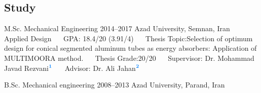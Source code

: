 \documentclass[
	a4paper,
]{ThirtyNinesecondscv}
\begin{document}
\makefrontsidebar



\subsection{Study}
\begin{cvtable}[1.5]
	\Educvitem
            {\faGraduationCap}
            {M.Sc. Mechanical Engineering}
            {2014--2017}
            {Azad University, Semnan, Iran}
    		{ }
            \Shortcustomcvitem
            {~~}
            {\hspace{-0.3em}Applied Design}
            {}
            \Shortcustomcvitem
            {~~}
            {GPA:}
            {18.4/20 (3.91/4)}
            \Shortcustomcvitem
            {~~}
            {Thesis Topic:}{{\small Selection of optimum design for conical segmented aluminum tubes as energy absorbers: Application of MULTIMOORA method.}}
            \Shortcustomcvitem
            {~~}
            {Thesis Grade:}{20/20}
            \Shortcustomcvitem
            {~~}
            {Supervisor:}
            {Dr. Mohammad Javad Rezvani$ ^{\textcolor[rgb]{0.00,0.50,1.00}{\textbf{1}}} $}
             \Shortcustomcvitem
            {~~}
            {Advisor:}
            {Dr. Ali Jahan$ ^{\textcolor[rgb]{0.00,0.50,1.00}{\textbf{2}}} $}
            
        \Educvitem
            {\faGraduationCap}
            {B.Sc. Mechanical engineering}
            {2008--2013}
            {Azad University, Parand,  Iran}
            {}
\end{cvtable}

\end{document}
